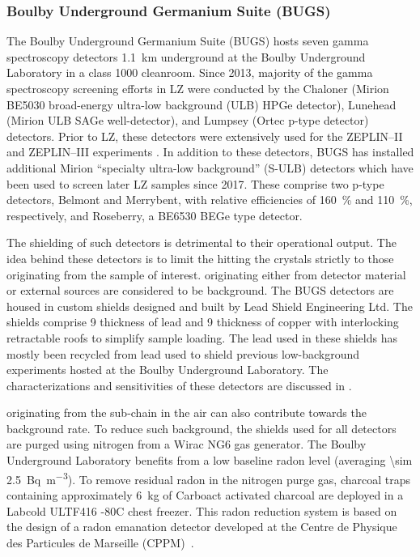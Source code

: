 \subsubsection{Boulby Underground Germanium Suite (BUGS)}

The Boulby Underground Germanium Suite (BUGS) hosts seven gamma spectroscopy detectors \SI{1.1}{\km} underground at the Boulby Underground Laboratory in a class 1000 cleanroom. Since 2013, majority of the gamma spectroscopy screening efforts in LZ were conducted by the Chaloner (Mirion BE5030 broad-energy ultra-low background (ULB) HPGe detector), Lunehead (Mirion ULB SAGe well-detector), and Lumpsey (Ortec p-type detector) detectors. Prior to LZ, these detectors were extensively used for the ZEPLIN--II and ZEPLIN--III experiments \cite{Alner:2007ja, Araujo:2011as}. In addition to these detectors, BUGS has installed additional Mirion ``specialty ultra-low background'' (S-ULB) detectors which have been used to screen later LZ samples since 2017. These comprise two p-type detectors, Belmont and Merrybent, with relative efficiencies of \SI{160}{\percent} and \SI{110}{\percent}, respectively, and Roseberry, a BE6530 BEGe type detector.

The shielding of such detectors is detrimental to their operational output. The idea behind these detectors is to limit the \grays{} hitting the crystals strictly to those originating from the sample of interest. \grays{} originating either from detector material or external sources are considered to be background. The BUGS detectors are housed in custom shields designed and built by Lead Shield Engineering Ltd. The shields comprise 9 {\cm} thickness of lead and 9 \cm thickness of copper with interlocking retractable roofs to simplify sample loading. The lead used in these shields has mostly been recycled from lead used to shield previous low-background experiments hosted at the Boulby Underground Laboratory. The characterizations and sensitivities of these detectors are discussed in \cite{bugs_boulby}.

\grays{} originating from the \RnTTT{} sub-chain in the air can also contribute towards the background rate. To reduce such background, the shields used for all detectors are purged using nitrogen from a Wirac NG6 gas generator. The Boulby Underground Laboratory benefits from a low baseline radon level (averaging \SI{\sim 2.5}{\becquerel\per\m\cubed}). To remove residual radon in the nitrogen purge gas, charcoal traps containing approximately \SI{6}{\kilogram} of Carboact activated charcoal are deployed in a Labcold ULTF416 -80C chest freezer. This radon reduction system is based on the design of a radon emanation detector developed at the Centre de Physique des Particules de Marseille (CPPM)~\cite{Noel:2015nla}. 


